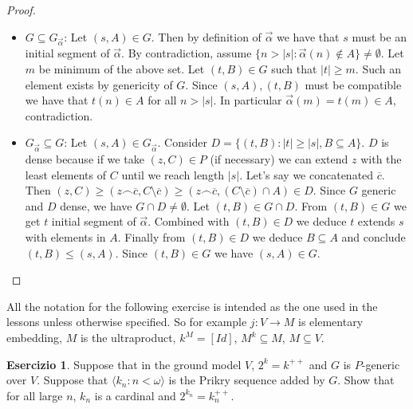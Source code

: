 \documentclass[a4paper,12pt]{article}
\theoremstyle{plain}
\theoremstyle{definition}
\newtheorem{esercizio}{Esercizio}
\theoremstyle{remark}
\begin{document}
\begin{proof}

	
	\begin{itemize}
		\item $G \subseteq G_{\vec{\alpha}}$:
			Let $(s,A) \in G$. Then by definition of $\vec{\alpha}$ we have that $s$ must be an initial segment of $\vec{\alpha}$.
			By contradiction, assume $\{n> |s| : \vec{\alpha}(n) \not \in A\} \not = \emptyset$.
			Let $m$ be minimum of the above set. Let $(t,B) \in G$ such that $|t| \geq m$.
			Such an element exists by genericity of $G$.
			Since $(s,A), (t,B)$ must be compatible we have that $t(n) \in A$ for all $n > |s|$. 
			In particular $\vec{\alpha}(m) = t(m) \in A$, contradiction.
			
		\item $G_{\vec{\alpha}} \subseteq G$:
			Let $(s,A) \in G_{\vec{\alpha}}$. Consider $D = \{(t,B) : |t| \geq |s|, B \subseteq A\}$.
			$D$ is dense because if we take $(z,C) \in P$ (if necessary) we can extend $z$ with the least elements of $C$ until
			we reach length $|s|$. Let's say we concatenated $\overline{c}$. 
			Then $(z,C) \geq (z \frown \overline{c}, C \setminus \overline{c}) 
			\geq (z \frown \overline{c}, (C \setminus \overline{c}) \cap A) \in D$.
			Since $G$ generic and $D$ dense, we have $G \cap D \not = \emptyset$. 
			Let $(t,B) \in G \cap D$. From $(t,B) \in G$ we get $t$ initial segment of $\vec{\alpha}$.
			Combined with $(t,B) \in D$ we deduce $t$ extends $s$ with elements in $A$.
			Finally from $(t,B) \in D$ we deduce $B \subseteq A$ and conclude $(t,B) \leq (s,A)$.
			Since $(t,B) \in G$ we have $(s,A) \in G$.

	\end{itemize}
\end{proof}



All the notation for the following exercise is intended as the one used in the lessons unless otherwise specified.
So for example $j: V \to M$ is elementary embedding, $M$ is the ultraproduct, $k^{M} = [Id]$, $M^{k} \subseteq M$, $M \subseteq V$.

\begin{esercizio}
	
	Suppose that in the ground model $V$, $2^{k} = k^{++}$ and $G$ is $P$-generic over $V$.
	Suppose that $\langle k_n : n < \omega \rangle$ is the Prikry sequence added by $G$.
	Show that for all large $n$, $k_n$ is a cardinal and $2^{k_n} = k_n ^{++}$.
	
\end{esercizio}
\end{document}
